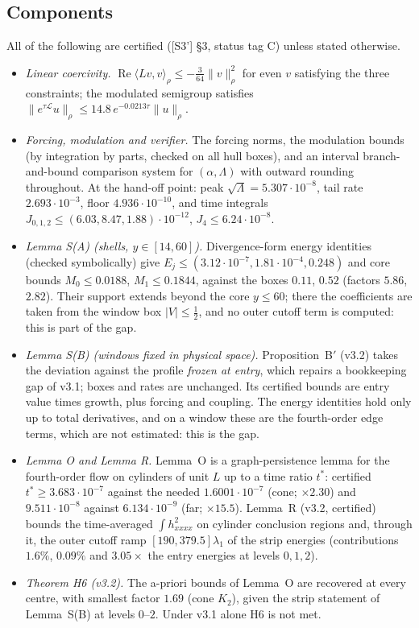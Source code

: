 \documentclass[11pt]{amsart}
\theoremstyle{definition}
\theoremstyle{remark}
\newcommand{\ip}[2]{\langle #1,#2\rangle}
\newcommand{\Lam}{\Lambda}
\newcommand{\norm}[1]{\lVert #1\rVert}
\newcommand{\dref}[1]{[\textsf{#1}]}
\begin{document}
\subsection{Components}
All of the following are certified (\dref{S3'} \S3, status tag C) unless stated otherwise.
\begin{itemize}[leftmargin=*,itemsep=1pt]
\item \emph{Linear coercivity.} $\operatorname{Re}\ip{Lv}v_\rho\le-\frac3{64}\norm{v}_\rho^2$ for even $v$ satisfying the three constraints; the modulated semigroup satisfies $\norm{e^{\tau\mathcal L}u}_\rho\le14.8\,e^{-0.0213\tau}\norm u_\rho$.
\item \emph{Forcing, modulation and verifier.} The forcing norms, the modulation bounds (by integration by parts, checked on all hull boxes), and an interval branch-and-bound comparison system for $(\alpha,\Lam)$ with outward rounding throughout. At the hand-off point: peak $\sqrt\Lam=5.307\cdot10^{-8}$, tail rate $2.693\cdot10^{-3}$, floor $4.936\cdot10^{-10}$, and time integrals $J_{0,1,2}\le(6.03,8.47,1.88)\cdot10^{-12}$, $J_4\le6.24\cdot10^{-8}$.
\item \emph{Lemma S(A) (shells, $y\in[14,60]$).} Divergence-form energy identities (checked symbolically) give $E_j\le(3.12\cdot10^{-7},1.81\cdot10^{-4},0.248)$ and core bounds $M_0\le0.0188$, $M_1\le0.1844$, against the boxes $0.11$, $0.52$ (factors $5.86$, $2.82$). Their support extends beyond the core $y\le60$; there the coefficients are taken from the window box $|V|\le\frac12$, and no outer cutoff term is computed: this is part of the gap.
\item \emph{Lemma S(B) (windows fixed in physical space).} Proposition~B$'$ (v3.2) takes the deviation against the profile \emph{frozen at entry}, which repairs a bookkeeping gap of v3.1; boxes and rates are unchanged. Its certified bounds are entry value times growth, plus forcing and coupling. The energy identities hold only up to total derivatives, and on a window these are the fourth-order edge terms, which are not estimated: this is the gap.
\item \emph{Lemma O and Lemma R.} Lemma~O is a graph-persistence lemma for the fourth-order flow on cylinders of unit $L$ up to a time ratio $t^*$: certified $t^*\ge3.683\cdot10^{-7}$ against the needed $1.6001\cdot10^{-7}$ (cone; $\times2.30$) and $9.511\cdot10^{-8}$ against $6.134\cdot10^{-9}$ (far; $\times15.5$). Lemma~R (v3.2, certified) bounds the time-averaged $\int h_{xxxx}^2$ on cylinder conclusion regions and, through it, the outer cutoff ramp $[190,379.5]\lambda_1$ of the strip energies (contributions $1.6\%$, $0.09\%$ and $3.05\times$ the entry energies at levels $0,1,2$).
\item \emph{Theorem H6 (v3.2).} The a-priori bounds of Lemma~O are recovered at every centre, with smallest factor $1.69$ (cone $K_2$), given the strip statement of Lemma~S(B) at levels $0$--$2$. Under v3.1 alone H6 is not met.
\end{itemize}
\end{document}
